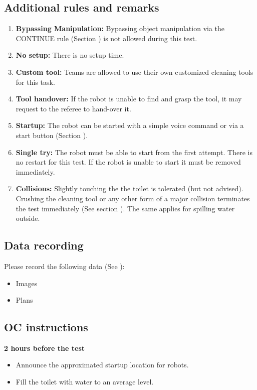\subsection{Additional rules and remarks}
\begin{enumerate}
	\item \textbf{Bypassing Manipulation:} Bypassing object manipulation via the CONTINUE rule (Section ) is not allowed during this test.
	\item \textbf{No setup:} There is no setup time.
	\item \textbf{Custom tool:} Teams are allowed to use their own customized cleaning tools for this task.
	\item \textbf{Tool handover:} If the robot is unable to find and grasp the tool, it may request to the referee to hand-over it.
	\item \textbf{Startup:} The robot can be started with a simple voice command or via a start button (Section ). 
	\item \textbf{Single try:} The robot must be able to start from the first attempt. There is no restart for this test. If the robot is unable to start it must be removed immediately.
	\item \textbf{Collisions:} Slightly touching the the toilet is tolerated (but not advised). Crushing the cleaning tool or any other form of a major collision terminates the test immediately (See section ). The same applies for spilling water outside.
\end{enumerate}

\subsection{Data recording}
Please record the following data (See ):
\begin{itemize}
	\item Images
	\item Plans
\end{itemize}

\subsection{OC instructions}

\textbf{2 hours before the test}
\begin{itemize}
	\item Announce the approximated startup location for robots.
	\item Fill the toilet with water to an average level.
\end{itemize}

